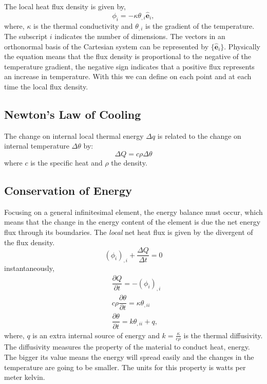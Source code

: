 \documentclass[10pt, a4paper]{article}
\begin{document}
The local heat flux density is given by,
\begin{equation}
\phi_i = - \kappa \theta_{,i} \mathbf{\hat{e}}_i,
\end{equation}
where, $\kappa$ is the thermal conductivity and $ \theta_{,i}$ is the gradient of the temperature. The subscript $i$ indicates the number of dimensions. The vectors in an orthonormal basis of the Cartesian system can be represented by $\{ \mathbf{\hat{e}}_i\}$. Physically the equation means that the flux density is proportional to the negative of the temperature gradient, the negative sign indicates that a positive flux represents an increase in temperature. With this we can define on each point and at each time the local flux density.

\subsection{Newton's Law of Cooling}

The change on internal local thermal energy $\Delta q$ is related to the change on internal temperature $\Delta \theta$ by:
\begin{equation}
\Delta Q =c \rho \Delta \theta
\end{equation}
where $c$ is the specific heat and $\rho$ the density.

\subsection{Conservation of Energy}

Focusing on a general infinitesimal element, the energy balance must occur, which means that the change in the energy content of the element is due the net energy flux through its boundaries. The \emph{local} net heat flux is given by the divergent of the flux density.
\begin{equation}
 (\phi_i)_{,i} + \dfrac{\Delta Q}{\Delta t}  = 0
\end{equation}
instantaneously, 
\begin{align*}
&\dfrac{\partial Q}{\partial t} = - (\phi_i)_{,i}  \\
& c  \rho \dfrac{\partial \theta}{\partial t} = \kappa \theta_{,ii} \\
& \dfrac{\partial \theta}{\partial t} =  k \theta_{,ii} + q,
\end{align*}
where, $q$ is an extra internal source of energy and $k=\frac{\kappa}{c \rho}$ is the thermal diffusivity. The diffusivity measures the property of the material to conduct heat, energy. The bigger its value means the energy will spread easily and the changes in the temperature are going to be smaller. The units for this property is watts per meter kelvin.
\end{document}
